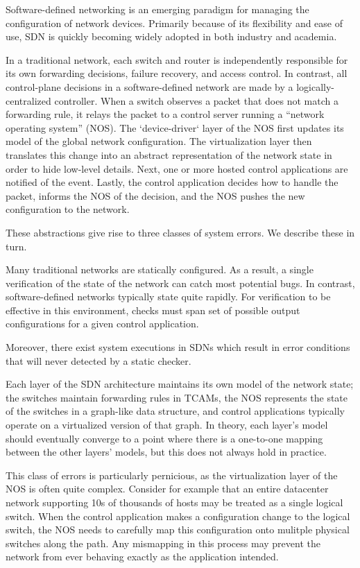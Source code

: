 Software-defined networking is an emerging paradigm for managing the
configuration of network devices. Primarily because of its flexibility and ease of use, SDN is
quickly becoming widely adopted in both industry and academia. 

In a traditional network, each switch and router is independently responsible for
its own forwarding decisions, failure recovery, and access control. In
contrast, all control-plane decisions in a software-defined network are made by
a logically-centralized controller. When a
switch observes a packet that does not match a forwarding rule, 
it relays the packet to a control server running a ``network operating system''
(NOS). The `device-driver` layer of the NOS first updates its model of the global network configuration.
The virtualization layer then translates this change into an abstract 
representation of the network state in order to hide low-level details. Next, one or more hosted control
applications are notified of the event. Lastly, the
control application decides how to handle the packet, informs the NOS of the decision,
and the NOS pushes the new configuration to the network.

These abstractions give rise to three classes of system errors. We describe these in turn.

 Many traditional networks are statically configured.
As a result, a single verification of the state of the network can catch most potential bugs. 
In contrast, software-defined networks typically state quite rapidly. For verification to be
effective in this environment, checks must span set of possible output configurations for a given control
application.

Moreover, there exist system executions in SDNs which result in error conditions that will never 
detected by a static checker. 

  Each layer of the SDN architecture
maintains its own model of the network state; the switches maintain forwarding
rules in TCAMs, the NOS represents the state of the switches in a graph-like data
structure, and control applications typically operate on 
a virtualized version of that graph. In theory, each layer's model should eventually
converge to a point where there is a one-to-one mapping 
between the other layers' models, but this does not always hold in practice.

This class of errors is particularly pernicious, as the 
virtualization layer of the NOS is often quite complex. Consider for example
that an entire datacenter network supporting 10s of thousands of hosts may be
treated as a single logical switch. When the control application makes a
configuration change to the logical switch, the NOS needs to carefully map this
configuration onto mulitple physical switches along the path. Any mismapping in this
process may prevent the network from ever behaving exactly as the application intended.

